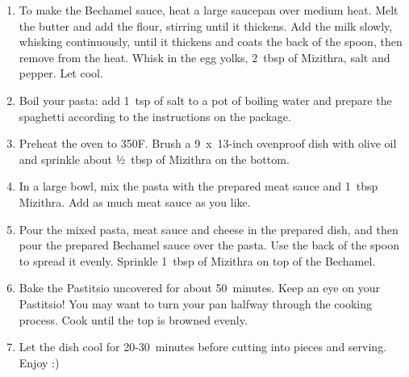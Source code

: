 \begin{enumerate}
    \item To make the Bechamel sauce, heat a large saucepan over medium heat. Melt the butter and add the flour, stirring until it thickens. Add the milk slowly, whisking continuously, until it thickens and coats the back of the spoon, then remove from the heat. Whisk in the egg yolks, 2~tbsp of Mizithra, salt and pepper. Let cool.
    \item Boil your pasta: add 1~tsp of salt to a pot of boiling water and prepare the spaghetti according to the instructions on the package.
    \item Preheat the oven to 350\degree F. Brush a 9~x~13-inch ovenproof dish with olive oil and sprinkle about ½~tbsp of Mizithra on the bottom.
    \item In a large bowl, mix the pasta with the prepared meat sauce and 1~tbsp Mizithra. Add as much meat sauce as you like.
    \item Pour the mixed pasta, meat sauce and cheese in the prepared dish, and then pour the prepared Bechamel sauce over the pasta. Use the back of the spoon to spread it evenly. Sprinkle 1~tbsp of Mizithra on top of the Bechamel.
    \item Bake the Pastitsio uncovered for about 50~minutes. Keep an eye on your Pastitsio! You may want to turn your pan halfway through the cooking process. Cook until the top is browned evenly.
    \item Let the dish cool for 20-30~minutes before cutting into pieces and serving. Enjoy :)
\end{enumerate}
